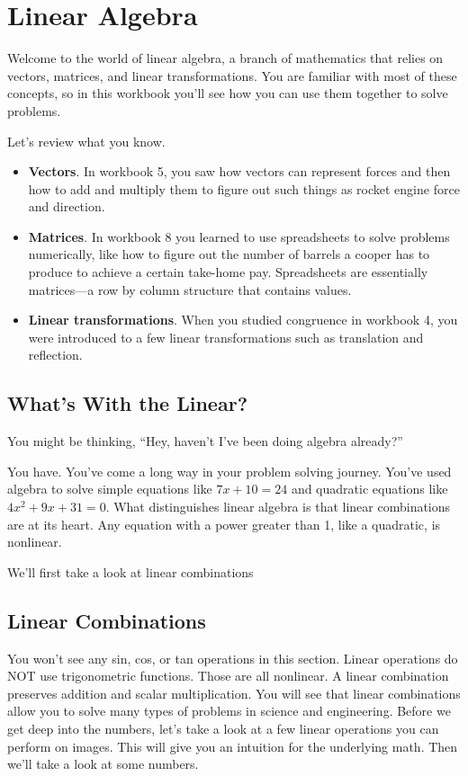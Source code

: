 \chapter{Linear Algebra}

Welcome to the world of linear algebra, a branch of mathematics that relies on vectors, matrices, and linear transformations. You are familiar with most of these concepts, so in this workbook you’ll see how you can use them together to solve problems.  

Let’s review what you know.

\begin{itemize}
\item \textbf{Vectors}. In workbook 5, you saw how vectors can represent forces and then how to add and multiply them to figure out such things as rocket engine force and direction. 
\item \textbf{Matrices}. In workbook 8 you learned to use spreadsheets to solve problems numerically, like how to figure out the number of barrels a cooper has to produce to achieve a certain take-home pay. Spreadsheets are essentially matrices—a row by column structure that contains values. 
\item \textbf{Linear transformations}. When you studied congruence in workbook 4, you were introduced to a few linear transformations such as translation and reflection. 
\end{itemize}

\section{What's With the Linear?}

You might be thinking, “Hey, haven’t I’ve been doing algebra already?” 

You have. You've come a long way in your problem solving journey. You've used algebra to solve simple equations like $7x + 10 = 24$ and quadratic equations like $4x^{2} + 9x + 31 = 0$. What distinguishes linear algebra is that linear combinations are at its heart. Any equation with a power greater than 1, like a quadratic, is nonlinear.

We’ll first take a look at linear combinations

\section{Linear Combinations}

You won’t see any sin, cos, or tan operations in this section. Linear operations do NOT use trigonometric functions. Those are all nonlinear. A linear combination  preserves addition and scalar multiplication. You will see that linear combinations allow you to solve many types of problems in science and engineering. Before we get deep into the numbers, let’s take a look at a few linear operations you can perform on images. This will give you an intuition for the underlying math. Then we’ll take a look at some numbers.

